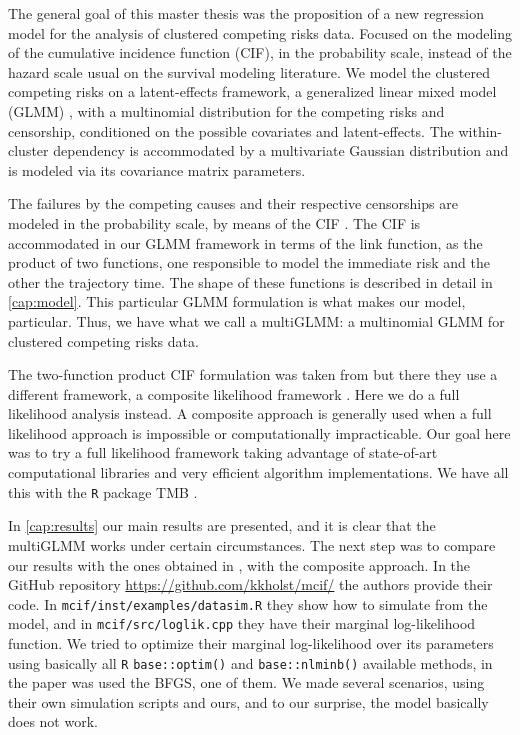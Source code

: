 The general goal of this master thesis was the proposition of a new
regression model for the analysis of clustered competing risks
data. Focused on the modeling of the cumulative incidence function
(CIF), in the probability scale, instead of the hazard scale usual on
the survival modeling literature. We model the clustered competing risks
on a latent-effects framework, a generalized linear mixed model (GLMM)
\cite{GLMM}, with a multinomial distribution for the competing risks and
censorship, conditioned on the possible covariates and
latent-effects. The within-cluster dependency is accommodated by a
multivariate Gaussian distribution and is modeled via its covariance
matrix parameters.

The failures by the competing causes and their respective censorships
are modeled in the probability scale, by means of the CIF
\cite{kalb&prentice, andersen12}. The CIF is accommodated in our GLMM
framework in terms of the link function, as the product of two
functions, one responsible to model the immediate risk and the other the
trajectory time. The shape of these functions is described in detail in
\autoref{cap:model}. This particular GLMM formulation is what makes our
model, particular. Thus, we have what we call a multiGLMM: a multinomial
GLMM for clustered competing risks data.

The two-function product CIF formulation was taken from
 but there they use a different framework, a
composite likelihood framework \cite{lindsay88, cox&reid04, varin11}.
Here we do a full likelihood analysis instead. A composite approach is
generally used when a full likelihood approach is impossible or
computationally impracticable. Our goal here was to try a full
likelihood framework taking advantage of state-of-art computational
libraries and very efficient algorithm implementations. We have all this
with the \texttt{R} \cite{R21} package TMB \cite{TMB}.

In \autoref{cap:results} our main results are presented, and it is clear
that the multiGLMM works under certain circumstances. The next step was
to compare our results with the ones obtained in ,
with the composite approach. In the GitHub repository
\url{https://github.com/kkholst/mcif/} the authors provide their code.
In \texttt{mcif/inst/examples/datasim.R} they show how to simulate from
the model, and in \texttt{mcif/src/loglik.cpp} they have their marginal
log-likelihood function. We tried to optimize their marginal
log-likelihood over its parameters using basically all \texttt{R}
\texttt{base::optim()} and \texttt{base::nlminb()} available methods, in
the paper was used the BFGS, one of them. We made several scenarios,
using their own simulation scripts and ours, and to our surprise, the
model basically does not work.

